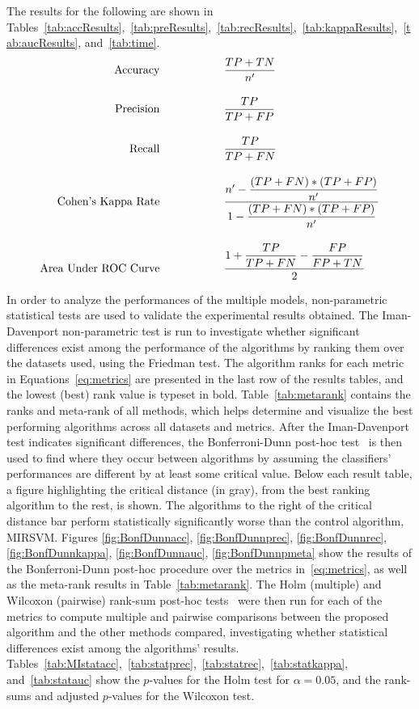 \documentclass[reqno]{vcuthesis}
\newcommand\tab[1][1cm]{\hspace*{#1}}
\numberwithin{equation}{chapter}
\begin{document}
The results for the following are shown in Tables~\ref{tab:accResults},~\ref{tab:preResults},~\ref{tab:recResults},~\ref{tab:kappaResults},~\ref{tab:aucResults}, and~\ref{tab:time}.
\begin{subequations}
\label{eq:metrics}
\begin{align}
\text{Accuracy} \tab \tab &\dfrac{TP+TN}{n^\prime} \label{eq:accuracy}\\[10pt]
\text{Precision} \tab \tab &\dfrac{TP}{TP+FP} \label{eq:precision}\\[10pt]
\text{Recall} \tab \tab &\dfrac{TP}{TP+FN} \label{eq:recall}\\[10pt]
\text{Cohen's Kappa Rate} \tab \tab &\dfrac{n^\prime - \dfrac{(TP+FN)*(TP+FP)}{n^\prime}}{1 - \dfrac{(TP+FN)*(TP+FP)}{n^\prime}} \label{eq:kappa}\\[10pt]
\text{Area Under ROC Curve} \tab \tab &\frac{1 + \dfrac{TP}{TP+FN} - \dfrac{FP}{FP+TN}}{2} \label{eq:auc}
\end{align}
\end{subequations}

In order to analyze the performances of the multiple models, non-parametric statistical tests are used to validate the experimental results obtained. The Iman-Davenport non-parametric test is run to investigate whether significant differences exist among the performance of the algorithms by ranking them over the datasets used, using the Friedman test. The algorithm ranks for each metric in Equations~\eqref{eq:metrics} are presented in the last row of the results tables, and the lowest (best) rank value is typeset in bold. Table~\ref{tab:metarank} contains the ranks and meta-rank of all methods, which helps determine and visualize the best performing algorithms across all datasets and metrics. 
\newpage
After the Iman-Davenport test indicates significant differences, the Bonferroni-Dunn post-hoc test~\cite{Dunn1961} is then used to find where they occur between algorithms by assuming the classifiers' performances are different by at least some critical value. Below each result table, a figure highlighting the critical distance (in gray), from the best ranking algorithm to the rest, is shown. The algorithms to the right of the critical distance bar perform statistically significantly worse than the control algorithm, MIRSVM. Figures \ref{fig:BonfDunnacc}, \ref{fig:BonfDunnprec}, \ref{fig:BonfDunnrec}, \ref{fig:BonfDunnkappa}, \ref{fig:BonfDunnauc}, \ref{fig:BonfDunnpmeta} show the results of the Bonferroni-Dunn post-hoc procedure over the metrics in~\eqref{eq:metrics}, as well as the meta-rank results in Table~\ref{tab:metarank}. The Holm (multiple) and Wilcoxon (pairwise) rank-sum post-hoc tests~\cite{Holander1999} were then run for each of the metrics to compute multiple and pairwise comparisons between the proposed algorithm and the other methods compared, investigating whether statistical differences exist among the algorithms' results. Tables~\ref{tab:MIstatacc},~\ref{tab:statprec},~\ref{tab:statrec},~\ref{tab:statkappa}, and~\ref{tab:statauc} show the $p$-values for the Holm test for $\alpha = 0.05$, and the rank-sums and adjusted $p$-values for the Wilcoxon test.
\end{document}
